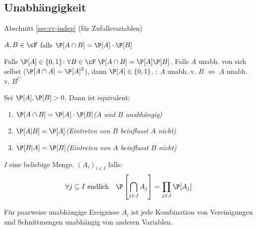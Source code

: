 \subsection{Unabhängigkeit}
\label{sec:basics-indep}
 Abschnitt \ref{sec:rv-indep} (für Zufallsvariablen)

\shortdefinition $A, B \in \cF$  falls $\P[A \cap B] = \P[A] \cdot \P[B]$

\shortremark Falls $\P[A] \in \{0, 1\}$: $\forall B \in \cF \; \P[A \cap B] = \P[A] \P[B]$.
Falls $A$ unabh. von sich selbst ($\P[A \cap A] = \P[A]^2$), dann $\P[A] \in \{0, 1\}$.
: $A$ unabh. v. $B$ $\Leftrightarrow$ $A$ unabh. v. $B^C$

\shorttheorem Sei $\P[A], \P[B] > 0$. Dann ist equivalent:
\begin{enumerate}[label=\textit{(\roman*)}]
    \item $\P[A \cap B] = \P[A] \cdot \P[B]$\quad \textit{($A$ und $B$ unabhängig)}
    \item $\P[A | B] = \P[A]$\quad \textit{(Eintreten von $B$ beinflusst $A$ nicht)}
    \item $\P[B | A] = \P[B]$\quad \textit{(Eintreten von $A$ beinflusst $B$ nicht)}
\end{enumerate}

\shortdefinition $I$ eine beliebige Menge. $(A_i)_{i \in I}$  falls:
\[
    \forall j \subseteq I \text{ endlich} \quad \P\left[ \bigcap_{j \in J} A_j \right] = \prod_{j \in J} \P[A_j]
\]

\shortremark Für paarweise unabhängige Ereignisse $A_i$ ist jede Kombination von Vereinigungen und Schnittmengen unabhängig von anderen Variablen.
